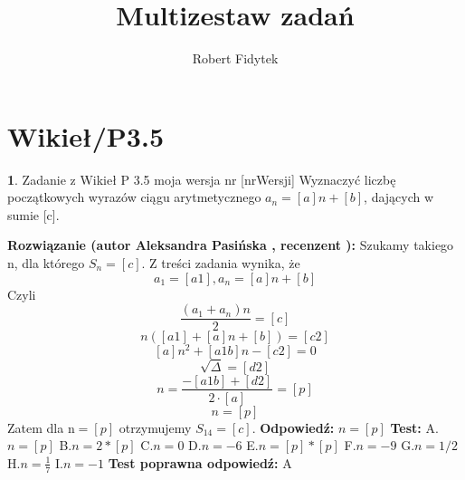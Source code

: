 \documentclass[12pt, a4paper]{article}
\title{Multizestaw zadań}
\author{Robert Fidytek}
\date{}
\theoremstyle{definition} %
\newtheorem{zad}{}
\newcommand{\kategoria}[1]{\section{#1}} %
\newcommand{\zadStart}[1]{\begin{zad}#1\newline} %
\newcommand{\zadStop}{\end{zad}}   %
\newcommand{\rozwStart}[2]{\noindent \textbf{Rozwiązanie (autor #1 , recenzent #2): }\newline} %
\newcommand{\rozwStop}{\newline}                                            %
\newcommand{\odpStart}{\noindent \textbf{Odpowiedź:}\newline}    %
\newcommand{\odpStop}{\newline}                                             %
\newcommand{\testStart}{\noindent \textbf{Test:}\newline} %
\newcommand{\testStop}{\newline} %
\newcommand{\kluczStart}{\noindent \textbf{Test poprawna odpowiedź:}\newline} %
\newcommand{\kluczStop}{\newline} %
\begin{document}
\maketitle


\kategoria{Wikieł/P3.5}
\zadStart{Zadanie z Wikieł P 3.5 moja wersja nr [nrWersji]}
Wyznaczyć liczbę początkowych wyrazów ciągu arytmetycznego $a_{n}=[a]n+[b]$, dających w sumie [c].
\zadStop
\rozwStart{Aleksandra Pasińska}{}
Szukamy takiego n, dla którego $S_{n}=[c]$. Z treści zadania wynika, że 
$$a_{1}=[a1], a_{n}=[a]n+[b]$$ Czyli 
$$\frac{(a_{1}+a_{n})n}{2}=[c]$$ 
$$n([a1]+[a]n+[b])=[c2]$$
$$[a]n^2+[a1b]n-[c2]=0$$
$$\sqrt{\Delta}=[d2]$$
$$n=\frac{-[a1b]+[d2]}{2\cdot [a]}=[p]$$
$$n=[p]$$
Zatem dla n$=[p]$ otrzymujemy $S_{14}=[c]$.
\rozwStop
\odpStart
$n=[p]$
\odpStop
\testStart
A.$n=[p]$
B.$n=2*[p]$
C.$n=0$
D.$n=-6$
E.$n=[p]*[p]$
F.$n=-9$
G.$n=1/2$
H.$n=\frac{1}{7}$
I.$n=-1$
\testStop
\kluczStart
A
\kluczStop
\end{document}
